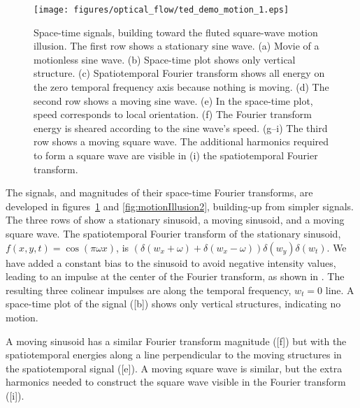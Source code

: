\begin{figure}[t]
    \centerline{
        \texttt{[image: figures/optical\_flow/ted\_demo\_motion\_1.eps]}
    }
    \caption{Space-time signals, building toward the fluted square-wave motion illusion. The first row shows a stationary sine wave. (a) Movie of a motionless sine wave. (b) Space-time plot shows only vertical structure. (c) Spatiotemporal Fourier transform shows all energy on the zero temporal frequency axis because nothing is moving. (d) The second row shows a moving sine wave. (e) In the space-time plot, speed corresponds to
        local orientation. (f) The Fourier transform energy is sheared according to
        the sine wave’s speed. (g–i) The third row shows a moving square wave. The additional harmonics required to form a square wave are visible in (i) the spatiotemporal Fourier transform.
    }
    \label{fig:motionIllusion1}
\end{figure}


The signals, and magnitudes of their space-time Fourier transforms, are developed in figures~\ref{fig:motionIllusion1} and \ref{fig:motionIllusion2}, building-up from simpler signals.  The three rows of \fig{\ref{fig:motionIllusion1}} show a stationary sinusoid, a moving sinusoid, and a moving square wave.  The spatiotemporal Fourier transform of the stationary sinusoid, $f(x,y,t) = \cos(\pi \omega x)$, is $(\delta(w_x + \omega) + \delta(w_x - \omega)) \delta(w_y) \delta(w_t) $.  We have added a constant bias to the sinusoid to avoid negative intensity values, leading to an impulse at the center of the Fourier transform, as shown in .  The resulting three colinear impulses are along the temporal frequency, $w_t = 0$ line.  A space-time plot of the signal (\fig{\ref{fig:motionIllusion1}}[b]) shows only vertical structures, indicating no motion.

A moving sinusoid has a similar Fourier transform magnitude (\fig{\ref{fig:motionIllusion1}}[f]) but with the spatiotemporal energies along a line perpendicular to the moving structures in the spatiotemporal signal (\fig{\ref{fig:motionIllusion1}}[e]).  A moving square wave is similar, but the extra harmonics needed to construct the square wave visible in the Fourier transform (\fig{\ref{fig:motionIllusion1}}[i]).


